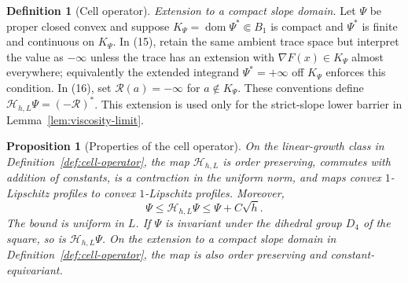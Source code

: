 \documentclass{smfart}
\newtheorem{proposition}[theorem]{Proposition}
\theoremstyle{definition}
\newtheorem{definition}[theorem]{Definition}
\newcommand{\1}{\mathbf 1}
\begin{document}
\begin{definition}[Cell operator]
\smallskip\noindent\emph{Extension to a compact slope domain.} Let
$\Psi$ be proper closed convex and suppose
$K_ \Psi=\operatorname {dom}\Psi^*\Subset B_ 1$ is compact and
$\Psi^*$ is finite and continuous on $K_ \Psi$.  In (15), retain the
same ambient trace space but interpret the value as $-\infty$ unless
the trace has an extension with
$\nabla F(x)\in K_ \Psi$ almost everywhere; equivalently the extended
integrand $\Psi^*=+\infty$ off $K_ \Psi$ enforces this condition.
In (16), set $\mathcal R(a)=-\infty$ for $a\notin K_ \Psi$.  These conventions
define $\mathcal H_ {h,L}\Psi=(-\mathcal R)^*$.  This extension is used only for the strict-slope lower barrier in
Lemma~\ref{lem:viscosity-limit}.

\end{definition}

\begin{proposition}[Properties of the cell operator]\label{prop:cell-operator-properties}
On the linear-growth class in Definition~\ref{def:cell-operator}, the map $\mathcal H_ {h,L}$ is order preserving,
commutes with addition of constants, is a contraction in the uniform
norm, and maps convex $1$-Lipschitz profiles to convex
$1$-Lipschitz profiles.  Moreover,
\begin{equation}
\Psi\leq\mathcal H_ {h,L}\Psi\leq\Psi+C\sqrt h.
\tag{16a}
\end{equation}
The bound is uniform in $L$.  If $\Psi$ is invariant under the dihedral group
$D_ 4$ of the square, so is $\mathcal H_ {h,L}\Psi$.
On the extension to a compact slope domain in Definition~\ref{def:cell-operator},
the map is also order preserving and constant-equivariant.
\end{proposition}
\end{document}
